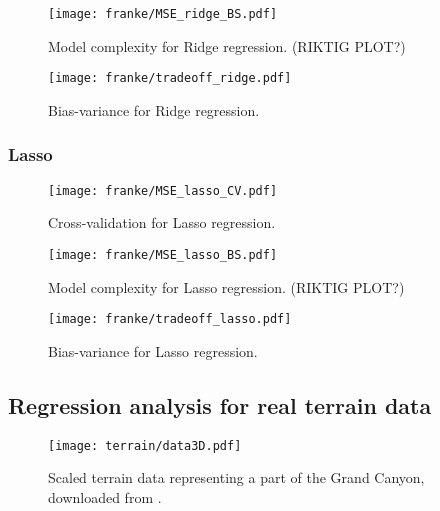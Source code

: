         \begin{figure}
            \texttt{[image: franke/MSE\_ridge\_BS.pdf]}
            \caption{Model complexity for Ridge regression. (RIKTIG PLOT?)}
            \label{fig:model_complexity_ridge}
        \end{figure}

        \begin{figure}
            \texttt{[image: franke/tradeoff\_ridge.pdf]}
            \caption{Bias-variance for Ridge regression.}
            \label{fig:bias_variance_ridge}
        \end{figure}

        \subsubsection{Lasso}\label{sec:lassoanalysis}

        \begin{figure}
            \texttt{[image: franke/MSE\_lasso\_CV.pdf]}
            \caption{Cross-validation for Lasso regression.}
            \label{fig:cross-validation_lasso}
        \end{figure}

        \begin{figure}
            \texttt{[image: franke/MSE\_lasso\_BS.pdf]}
            \caption{Model complexity for Lasso regression. (RIKTIG PLOT?)}
            \label{fig:model_complexity_lasso}
        \end{figure}

        \begin{figure}
            \texttt{[image: franke/tradeoff\_lasso.pdf]}
            \caption{Bias-variance for Lasso regression.}
            \label{fig:bias_variance_lasso}
        \end{figure}



    \subsection{Regression analysis for real terrain data}\label{sec:reganalysis_real_data}

    \begin{figure}
        \texttt{[image: terrain/data3D.pdf]}
        \caption{Scaled terrain data representing a part of the Grand Canyon, downloaded from \citep{EarthExplorer}.}
        \label{fig:gc_data}
    \end{figure}